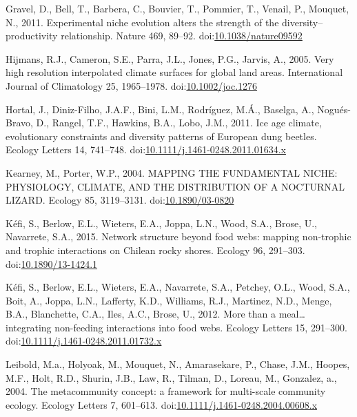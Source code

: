 \hypertarget{ref-Gravel2011c}{}
Gravel, D., Bell, T., Barbera, C., Bouvier, T., Pommier, T., Venail, P.,
Mouquet, N., 2011. Experimental niche evolution alters the strength of
the diversity--productivity relationship. Nature 469, 89--92.
doi:\href{https://doi.org/10.1038/nature09592}{10.1038/nature09592}

\hypertarget{ref-Hijmans2005}{}
Hijmans, R.J., Cameron, S.E., Parra, J.L., Jones, P.G., Jarvis, A.,
2005. Very high resolution interpolated climate surfaces for global land
areas. International Journal of Climatology 25, 1965--1978.
doi:\href{https://doi.org/10.1002/joc.1276}{10.1002/joc.1276}

\hypertarget{ref-Hortal2011}{}
Hortal, J., Diniz-Filho, J.A.F., Bini, L.M., Rodríguez, M.Á., Baselga,
A., Nogués-Bravo, D., Rangel, T.F., Hawkins, B.A., Lobo, J.M., 2011. Ice
age climate, evolutionary constraints and diversity patterns of European
dung beetles. Ecology Letters 14, 741--748.
doi:\href{https://doi.org/10.1111/j.1461-0248.2011.01634.x}{10.1111/j.1461-0248.2011.01634.x}

\hypertarget{ref-Kearney2004}{}
Kearney, M., Porter, W.P., 2004. MAPPING THE FUNDAMENTAL NICHE:
PHYSIOLOGY, CLIMATE, AND THE DISTRIBUTION OF A NOCTURNAL LIZARD. Ecology
85, 3119--3131.
doi:\href{https://doi.org/10.1890/03-0820}{10.1890/03-0820}

\hypertarget{ref-Kefi2015}{}
Kéfi, S., Berlow, E.L., Wieters, E.A., Joppa, L.N., Wood, S.A., Brose,
U., Navarrete, S.A., 2015. Network structure beyond food webs: mapping
non-trophic and trophic interactions on Chilean rocky shores. Ecology
96, 291--303.
doi:\href{https://doi.org/10.1890/13-1424.1}{10.1890/13-1424.1}

\hypertarget{ref-Kefi2012}{}
Kéfi, S., Berlow, E.L., Wieters, E.A., Navarrete, S.A., Petchey, O.L.,
Wood, S.A., Boit, A., Joppa, L.N., Lafferty, K.D., Williams, R.J.,
Martinez, N.D., Menge, B.A., Blanchette, C.A., Iles, A.C., Brose, U.,
2012. More than a meal\ldots{} integrating non-feeding interactions into
food webs. Ecology Letters 15, 291--300.
doi:\href{https://doi.org/10.1111/j.1461-0248.2011.01732.x}{10.1111/j.1461-0248.2011.01732.x}

\hypertarget{ref-Leibold2004}{}
Leibold, M.a., Holyoak, M., Mouquet, N., Amarasekare, P., Chase, J.M.,
Hoopes, M.F., Holt, R.D., Shurin, J.B., Law, R., Tilman, D., Loreau, M.,
Gonzalez, a., 2004. The metacommunity concept: a framework for
multi-scale community ecology. Ecology Letters 7, 601--613.
doi:\href{https://doi.org/10.1111/j.1461-0248.2004.00608.x}{10.1111/j.1461-0248.2004.00608.x}

